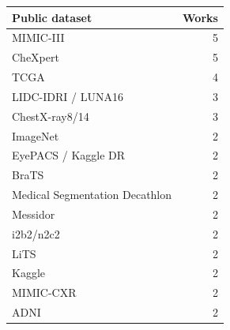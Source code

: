 \begin{tabular}{@{}lr@{}}
\toprule
Public dataset & Works\\
\midrule
MIMIC-III & 5\\
CheXpert & 5\\
TCGA & 4\\
LIDC-IDRI / LUNA16 & 3\\
ChestX-ray8/14 & 3\\
ImageNet & 2\\
EyePACS / Kaggle DR & 2\\
BraTS & 2\\
Medical Segmentation Decathlon & 2\\
Messidor & 2\\
i2b2/n2c2 & 2\\
LiTS & 2\\
Kaggle & 2\\
MIMIC-CXR & 2\\
ADNI & 2\\
\bottomrule
\end{tabular}
